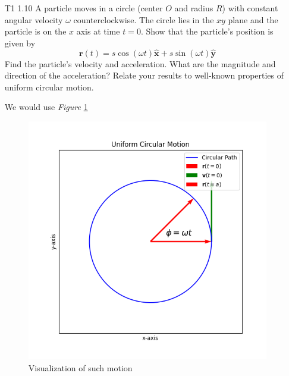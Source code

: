 \documentclass[12pt]{article}
\newcommand{\unx}{\hat{\mathbf{x}}}
\newcommand{\uny}{\hat{\mathbf{y}}}
\begin{document}
\begin{enumerate}
    \item[T1 1.10] A particle moves in a circle (center $O$ and radius $R$) with constant angular velocity $\omega$ counterclockwise. The circle lies in the $xy$ plane and the particle is on the $x$ axis at time $t = 0$. Show that the particle's position is given by
        \[
        \mathbf{r}(t) = s \cos(\omega t)\unx +  s \sin(\omega t)\uny
        \]
        Find the particle's velocity and acceleration. What are the magnitude and direction of the acceleration? Relate your results to well-known properties of uniform circular motion. 
        
        We would use \textit{Figure} \ref{fig:1.10}
            \begin{figure}[!h]
                \centering
                \includegraphics[width=0.4\linewidth]{Pictures/PS00/Figure_3c.png}
                \caption{Visualization of such motion}
                \label{fig:1.10}
            \end{figure}


\end{enumerate}
\end{document}
